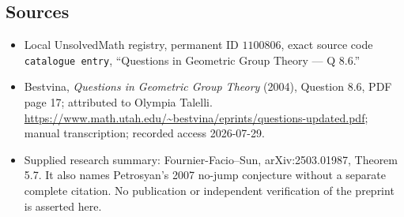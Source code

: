 \documentclass[11pt]{article}
\begin{document}
\subsection{Sources}
\begin{itemize}
\item Local UnsolvedMath registry, permanent ID \(1100806\), exact source code \texttt{catalogue entry}, ``Questions in Geometric Group Theory --- Q 8.6.''
\item Bestvina, \emph{Questions in Geometric Group Theory} (2004), Question 8.6, PDF page 17; attributed to Olympia Talelli. \url{https://www.math.utah.edu/~bestvina/eprints/questions-updated.pdf}; manual transcription; recorded access 2026-07-29.
\item Supplied research summary: Fournier-Facio--Sun, arXiv:2503.01987, Theorem 5.7. It also names Petrosyan's 2007 no-jump conjecture without a separate complete citation. No publication or independent verification of the preprint is asserted here.
\end{itemize}
\end{document}
